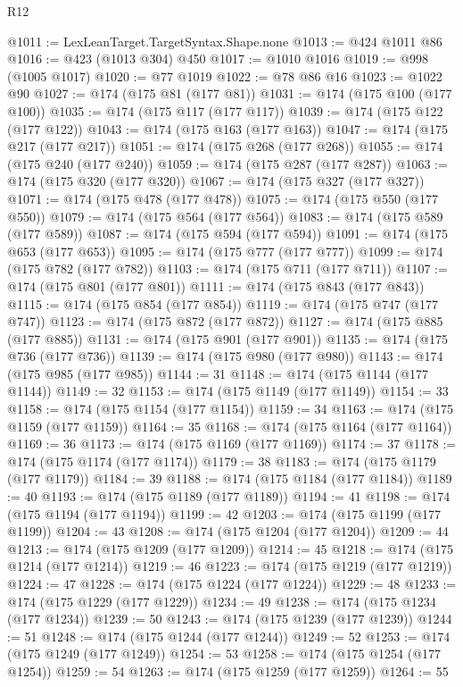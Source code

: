 \begin{lexlean}{R12}
\begin{coremodule}
@1011 := LexLeanTarget.TargetSyntax.Shape.none
@1013 := @424 @1011 @86
@1016 := @423 (@1013 @304) @450
@1017 := @1010 @1016
@1019 := @998 (@1005 @1017)
@1020 := @77 @1019
@1022 := @78 @86 @16
@1023 := @1022 @90
@1027 := @174 (@175 @81 (@177 @81))
@1031 := @174 (@175 @100 (@177 @100))
@1035 := @174 (@175 @117 (@177 @117))
@1039 := @174 (@175 @122 (@177 @122))
@1043 := @174 (@175 @163 (@177 @163))
@1047 := @174 (@175 @217 (@177 @217))
@1051 := @174 (@175 @268 (@177 @268))
@1055 := @174 (@175 @240 (@177 @240))
@1059 := @174 (@175 @287 (@177 @287))
@1063 := @174 (@175 @320 (@177 @320))
@1067 := @174 (@175 @327 (@177 @327))
@1071 := @174 (@175 @478 (@177 @478))
@1075 := @174 (@175 @550 (@177 @550))
@1079 := @174 (@175 @564 (@177 @564))
@1083 := @174 (@175 @589 (@177 @589))
@1087 := @174 (@175 @594 (@177 @594))
@1091 := @174 (@175 @653 (@177 @653))
@1095 := @174 (@175 @777 (@177 @777))
@1099 := @174 (@175 @782 (@177 @782))
@1103 := @174 (@175 @711 (@177 @711))
@1107 := @174 (@175 @801 (@177 @801))
@1111 := @174 (@175 @843 (@177 @843))
@1115 := @174 (@175 @854 (@177 @854))
@1119 := @174 (@175 @747 (@177 @747))
@1123 := @174 (@175 @872 (@177 @872))
@1127 := @174 (@175 @885 (@177 @885))
@1131 := @174 (@175 @901 (@177 @901))
@1135 := @174 (@175 @736 (@177 @736))
@1139 := @174 (@175 @980 (@177 @980))
@1143 := @174 (@175 @985 (@177 @985))
@1144 := 31
@1148 := @174 (@175 @1144 (@177 @1144))
@1149 := 32
@1153 := @174 (@175 @1149 (@177 @1149))
@1154 := 33
@1158 := @174 (@175 @1154 (@177 @1154))
@1159 := 34
@1163 := @174 (@175 @1159 (@177 @1159))
@1164 := 35
@1168 := @174 (@175 @1164 (@177 @1164))
@1169 := 36
@1173 := @174 (@175 @1169 (@177 @1169))
@1174 := 37
@1178 := @174 (@175 @1174 (@177 @1174))
@1179 := 38
@1183 := @174 (@175 @1179 (@177 @1179))
@1184 := 39
@1188 := @174 (@175 @1184 (@177 @1184))
@1189 := 40
@1193 := @174 (@175 @1189 (@177 @1189))
@1194 := 41
@1198 := @174 (@175 @1194 (@177 @1194))
@1199 := 42
@1203 := @174 (@175 @1199 (@177 @1199))
@1204 := 43
@1208 := @174 (@175 @1204 (@177 @1204))
@1209 := 44
@1213 := @174 (@175 @1209 (@177 @1209))
@1214 := 45
@1218 := @174 (@175 @1214 (@177 @1214))
@1219 := 46
@1223 := @174 (@175 @1219 (@177 @1219))
@1224 := 47
@1228 := @174 (@175 @1224 (@177 @1224))
@1229 := 48
@1233 := @174 (@175 @1229 (@177 @1229))
@1234 := 49
@1238 := @174 (@175 @1234 (@177 @1234))
@1239 := 50
@1243 := @174 (@175 @1239 (@177 @1239))
@1244 := 51
@1248 := @174 (@175 @1244 (@177 @1244))
@1249 := 52
@1253 := @174 (@175 @1249 (@177 @1249))
@1254 := 53
@1258 := @174 (@175 @1254 (@177 @1254))
@1259 := 54
@1263 := @174 (@175 @1259 (@177 @1259))
@1264 := 55

\end{coremodule}
\end{lexlean}
